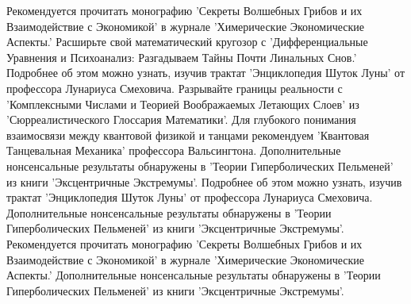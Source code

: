 \documentclass{article}
\begin{document}
\begin{thebibliography}{10}
Рекомендуется прочитать монографию 'Секреты Волшебных Грибов и их Взаимодействие с Экономикой' в журнале 'Химерические Экономические Аспекты.'
Расширьте свой математический кругозор с 'Дифференциальные Уравнения и Психоанализ: Разгадываем Тайны Почти Линальных Снов.'
Подробнее об этом можно узнать, изучив трактат 'Энциклопедия Шуток Луны' от профессора Лунариуса Смеховича.
Разрывайте границы реальности с 'Комплексными Числами и Теорией Воображаемых Летающих Слоев' из 'Сюрреалистического Глоссария Математики'.
Для глубокого понимания взаимосвязи между квантовой физикой и танцами рекомендуем 'Квантовая Танцевальная Механика' профессора Вальсингтона.
Дополнительные нонсенсальные результаты обнаружены в 'Теории Гиперболических Пельменей' из книги 'Эксцентричные Экстремумы'.
Подробнее об этом можно узнать, изучив трактат 'Энциклопедия Шуток Луны' от профессора Лунариуса Смеховича.
Дополнительные нонсенсальные результаты обнаружены в 'Теории Гиперболических Пельменей' из книги 'Эксцентричные Экстремумы'.
Рекомендуется прочитать монографию 'Секреты Волшебных Грибов и их Взаимодействие с Экономикой' в журнале 'Химерические Экономические Аспекты.'
Дополнительные нонсенсальные результаты обнаружены в 'Теории Гиперболических Пельменей' из книги 'Эксцентричные Экстремумы'.
\end{thebibliography}
\end{document}
